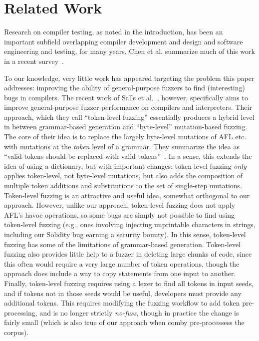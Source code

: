 \section{Related Work}

Research on compiler testing, as noted in the introduction, has been an important subfield overlapping compiler development and design and software engineering and testing, for many years.  Chen et al. summarize much of this work in a recent survey~\cite{chen2020survey}.

To our knowledge, very little work has appeared targeting the problem this paper addresses: improving the ability of general-purpose fuzzers to find (interesting) bugs in compilers.  The recent work of Salls et al.~\cite{Salls2021TokenLevel}, however, specifically aims to improve general-purpose fuzzer performance on compilers and interpreters.  Their approach, which they call ``token-level fuzzing'' essentially produces a hybrid level in between grammar-based generation and ``byte-level'' mutation-based fuzzing.  The core of their idea is to replace the largely byte-level mutations of AFL etc. with mutations at the \emph{token} level of a grammar.  They summarize the idea as ``valid tokens should be replaced with valid tokens''~\cite{Salls2021TokenLevel}.  In a sense, this extends the idea of using a dictionary, but with important changes:  token-level fuzzing \emph{only} applies token-level, not byte-level mutations, but also adds the composition of multiple token additions and substitutions to the set of single-step mutations.  Token-level fuzzing is an attractive and useful idea, somewhat orthogonal to our approach.  However, unlike our approach, token-level fuzzing does not apply AFL's havoc operations, so some bugs are simply not possible to find using token-level fuzzing (e.g., ones involving injecting unprintable characters in strings, including our Solidity bug earning a security bounty).  In this sense, token-level fuzzing has some of the limitations of grammar-based generation.  Token-level fuzzing also provides little help to a fuzzer in deleting large chunks of code, since this often would require a very large number of token operations, though the approach does include a way to copy statements from one input to another.  Finally, token-level fuzzing requires using a lexer to find all tokens in input seeds, and if tokens not in those seeds would be useful, developers must provide any additional tokens.  This requires modifying the fuzzing workflow to add token pre-processing, and is no longer strictly \emph{no-fuss}, though in practice the change is fairly small (which is also true of our approach when comby pre-processess the corpus).